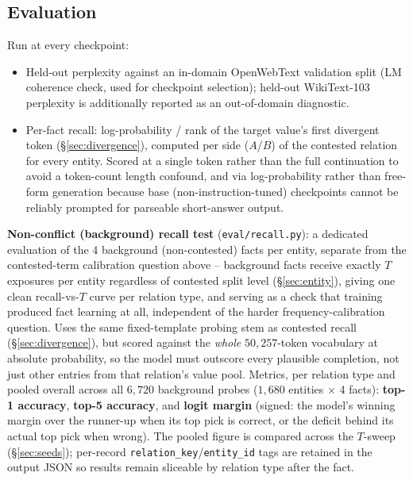 \documentclass[11pt]{article}
\begin{document}
\subsection{Evaluation}
\label{sec:eval}

Run at every checkpoint:
\begin{itemize}
  \item Held-out perplexity against an in-domain OpenWebText validation
    split (LM coherence check, used for checkpoint selection); held-out
    WikiText-103 perplexity is additionally reported as an out-of-domain
    diagnostic.
  \item Per-fact recall: log-probability / rank of the target value's first
    divergent token (\S\ref{sec:divergence}), computed per side ($A$/$B$) of
    the contested relation for every entity. Scored at a single token
    rather than the full continuation to avoid a token-count length
    confound, and via log-probability rather than free-form generation
    because base (non-instruction-tuned) checkpoints cannot be reliably
    prompted for parseable short-answer output.
\end{itemize}

\textbf{Non-conflict (background) recall test} (\texttt{eval/recall.py}): a
dedicated evaluation of the 4 background (non-contested) facts per entity,
separate from the contested-term calibration question above -- background
facts receive exactly $T$ exposures per entity regardless of contested split
level (\S\ref{sec:entity}), giving one clean recall-vs-$T$ curve per relation
type, and serving as a check that training produced fact learning at all,
independent of the harder frequency-calibration question. Uses the same
fixed-template probing stem as contested recall (\S\ref{sec:divergence}), but
scored against the \emph{whole} $50{,}257$-token vocabulary at absolute
probability, so the model must outscore every plausible completion, not just
other entries from that relation's value pool. Metrics, per relation type and
pooled overall across all $6{,}720$ background probes ($1{,}680$ entities
$\times$ 4 facts): \textbf{top-1 accuracy}, \textbf{top-5 accuracy}, and
\textbf{logit margin} (signed: the model's winning margin over the runner-up
when its top pick is correct, or the deficit behind its actual top pick when
wrong). The pooled figure is compared across the $T$-sweep
(\S\ref{sec:seeds}); per-record \texttt{relation\_key}/\texttt{entity\_id}
tags are retained in the output JSON so results remain sliceable by relation
type after the fact.
\end{document}
